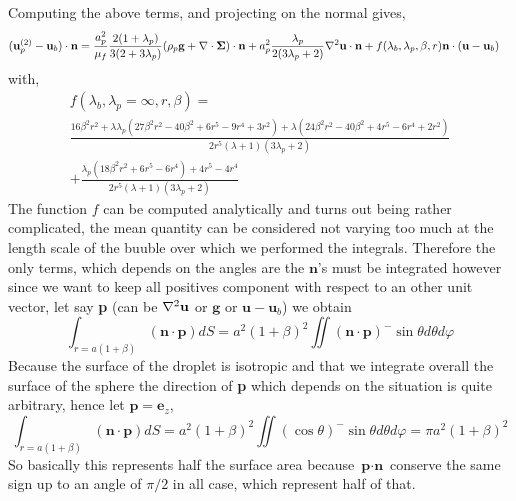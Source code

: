 \documentclass[12pt]{My_preprint}
\begin{document}
Computing the above terms, and projecting on the normal gives, 
\begin{align}
    (\textbf{u}_p^{(2)} -\textbf{u}_b)\cdot \textbf{n}
    &=
    \frac{a_p^2}{\mu_f}
    \frac{2(1+\lambda_p)}{3(2+3\lambda_p)}( \rho_p\textbf{g}+ \mathbf{\nabla}\cdot\bm\Sigma)\cdot\textbf{n}
    + a_p^2 \frac{\lambda_p}{2(3\lambda_p +2)} \mathbf{\nabla}^2 \textbf{u} \cdot\textbf{n}
    + f(\lambda_b,\lambda_p,\beta,r) \textbf{n}\cdot (\textbf{u} - \textbf{u}_b)
\end{align}
with, 
\begin{multline}
    f(\lambda_b,\lambda_p=\infty,r,\beta) =\\
    \frac{16 \beta^{2} r^{2} + \lambda \lambda_{p} \left(27 \beta^{2} r^{2} - 40 \beta^{2} + 6 r^{5} - 9 r^{4} + 3 r^{2}\right) + \lambda \left(24 \beta^{2} r^{2} - 40 \beta^{2} + 4 r^{5} - 6 r^{4} + 2 r^{2}\right)}{2 r^{5} \left(\lambda + 1\right) \left(3 \lambda_{p} + 2\right)}\\
    +
    \frac{ \lambda_{p} \left(18 \beta^{2} r^{2} + 6 r^{5} - 6 r^{4}\right) + 4 r^{5} - 4 r^{4}}{2 r^{5} \left(\lambda + 1\right) \left(3 \lambda_{p} + 2\right)}
\end{multline}
The function $f$ can be computed analytically and turns out being rather complicated, 
the mean quantity can be considered not varying too much at the length scale of the buuble over which we performed the integrals. 
Therefore the only terms, which depends on the angles are the $\textbf{n}$'s must be integrated however since we want to keep all positives component with respect to an other unit vector, let say \textbf{p} (can be $\mathbf{\nabla}^2 \textbf{u}$ or $\textbf{g}$ or $\textbf{u}-\textbf{u}_b$) we obtain 
\begin{equation}
    \int_{r=a(1+\beta)} (\textbf{n} \cdot \textbf{p})dS
    = a^2(1+\beta)^2
    \iint (\textbf{n} \cdot \textbf{p})^- \sin\theta d\theta d\varphi
\end{equation}
Because the surface of the droplet is isotropic and that we integrate overall the surface of the sphere the direction of \textbf{p} which depends on the situation is quite arbitrary, hence let $\textbf{p} = \textbf{e}_z$, 
\begin{equation}
    \int_{r=a(1+\beta)} (\textbf{n} \cdot \textbf{p})dS
    = a^2(1+\beta)^2
    \iint (\cos \theta)^- \sin\theta d\theta d\varphi
    = \pi a^2(1+\beta)^2
\end{equation}
So basically this represents half the surface area because $\textbf{p}\cdot \textbf{n}$ conserve the same sign up to an angle of $\pi/2$ in all case, which represent half of that. 
\end{document}
